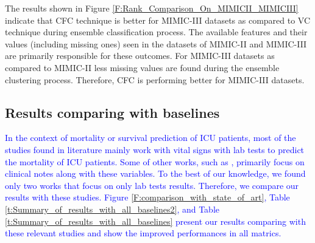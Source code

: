 The results shown in Figure \ref{F:Rank_Comparison_On_MIMICII_MIMICIII} indicate that CFC technique is better for MIMIC-III datasets as compared to VC technique during ensemble classification process. The available features and their values (including missing ones) seen in the datasets of MIMIC-II and MIMIC-III are primarily responsible for these outcomes. For MIMIC-III datasets as compared to MIMIC-II less missing values are found during the ensemble clustering process. Therefore, CFC is performing better for MIMIC-III datasets.             


 
\subsection{Results comparing with baselines}
\textcolor{blue}{In the context of mortality or survival prediction of ICU patients, most of the studies \cite{Pirracchio2015, Calvert2016, Bhattacharya2017, Xie2017, Awad2017, Johnson2nd2017, Darabi2018, Davoodi2018, Sadeghi2018, Purushotham2018} found in literature mainly work with vital signs with lab tests to predict the mortality of ICU patients. Some of other works, such as \cite{Ghassemi2015, Marafino2015, Grnarova2016, ZhengpingChe2016}, primarily focus on clinical notes along with these variables. To the best of our knowledge, we found only two works \cite{mehedy-masud:2017:fvc, mehedy-masud:2018:frmwrk} that focus on only lab tests results. Therefore, we compare our results with these studies. Figure \ref{F:comparison_with_state_of_art}, Table \ref{t:Summary_of_results_with_all_baselines2}, and Table \ref{t:Summary_of_results_with_all_baselines} present our results comparing with these relevant studies and show the improved performances in all matrics.}  

